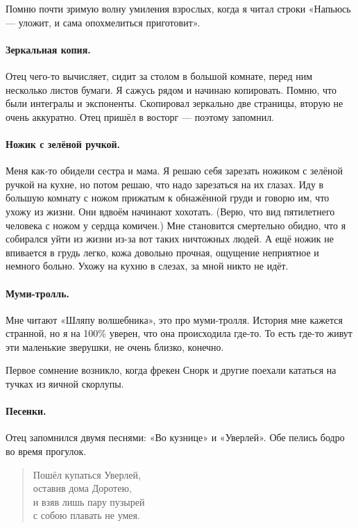 \documentclass{book}
\begin{document}
Помню почти зримую волну умиления взрослых, когда я читал строки «Напьюсь --- уложит, и сама опохмелиться приготовит». 

\paragraph{Зеркальная копия.}
Отец чего-то вычисляет, сидит за столом в большой комнате, перед ним несколько листов бумаги.
Я сажусь рядом и начинаю копировать.
Помню, что были интегралы и экспоненты.
Скопировал зеркально две страницы, вторую не очень аккуратно.
Отец пришёл в восторг --- поэтому запомнил.

\paragraph{Ножик с зелёной ручкой.}
Меня как-то обидели сестра и мама.
Я решаю себя зарезать ножиком с зелёной ручкой на кухне, но потом решаю, что надо зарезаться на их глазах.
Иду в большую комнату с ножом прижатым к обнажённой груди и говорю им, что ухожу из жизни. 
Они вдвоём начинают хохотать.
(Верю, что вид пятилетнего человека с ножом у сердца комичен.)
Мне становится смертельно обидно, что я собирался уйти из жизни из-за вот таких ничтожных людей.
А ещё ножик не впивается в грудь легко, кожа довольно прочная, ощущение неприятное и немного больно.
Ухожу на кухню в слезах, за мной никто не идёт.

\paragraph{Муми-тролль.} 
Мне читают «Шляпу волшебника», это про муми-тролля.
История мне кажется странной, но я на 100\% уверен, что она происходила где-то. 
То есть где-то живут эти маленькие зверушки, не очень близко, конечно.

Первое сомнение возникло, когда фрекен Снорк и другие поехали кататься на тучках из яичной скорлупы.

\paragraph{Песенки.}
Отец запомнился двумя песнями: «Во кузнице» и «Уверлей».
Обе пелись бодро во время прогулок.

\begin{verse}
Пошёл купаться Уверлей,\\
оставив дома Доротею,\\
и взяв лишь пару пузырей\\
с собою плавать не умея.
\end{verse}
\end{document}
